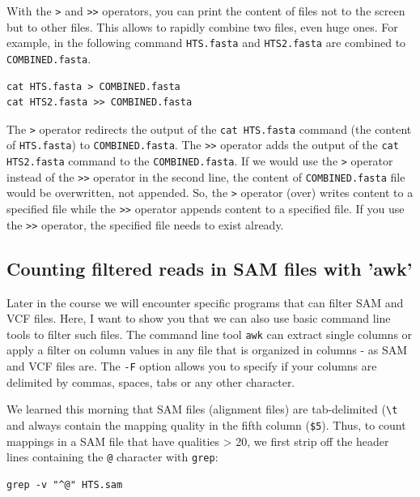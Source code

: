 \documentclass[11pt]{article}
\begin{document}
With the \texttt{>} and \texttt{>>} operators, you can print the content of files
not to the screen but to other files. This allows to rapidly combine
two files, even huge ones. For example, in the following command
\texttt{HTS.fasta} and \texttt{HTS2.fasta} are combined to
\texttt{COMBINED.fasta}.

\begin{verbatim}
cat HTS.fasta > COMBINED.fasta
cat HTS2.fasta >> COMBINED.fasta
\end{verbatim}

The \texttt{>} operator redirects the output of the \texttt{cat HTS.fasta}
command (the content of \texttt{HTS.fasta}) to \texttt{COMBINED.fasta}. The
\texttt{>>} operator adds the output of the \texttt{cat HTS2.fasta} command to
the \texttt{COMBINED.fasta}. If we would use the \texttt{>} operator instead of
the \texttt{>>} operator in the second line, the content of
\texttt{COMBINED.fasta} file would be overwritten, not appended. So, the \texttt{>}
operator (over) writes content to a specified file while the \texttt{>>}
operator appends content to a specified file. If you use the \texttt{>>}
operator, the specified file needs to exist already.



\subsection{Counting filtered reads in SAM files with 'awk'}
\label{sec-4-5}
Later in the course we will encounter specific programs that can filter
SAM and VCF files. Here, I want to show you that we can also use basic
command line tools to filter such files.  The command line tool \texttt{awk}
can extract single columns or apply a filter on column values in
any file that is organized in columns - as SAM and VCF files
are. The \texttt{-F} option allows you to specify if your columns are
delimited by commas, spaces, tabs or any other character.

We learned this morning that SAM files (alignment files) are
 tab-delimited (\texttt{\textbackslash{}t} and always contain the mapping quality in the
 fifth column (\texttt{\$5}). Thus, to count mappings in a SAM file that
 have qualities > 20, we first strip off the header lines
 containing the \texttt{@} character  with \texttt{grep}:

\begin{verbatim}
grep -v "^@" HTS.sam
\end{verbatim}
\end{document}
